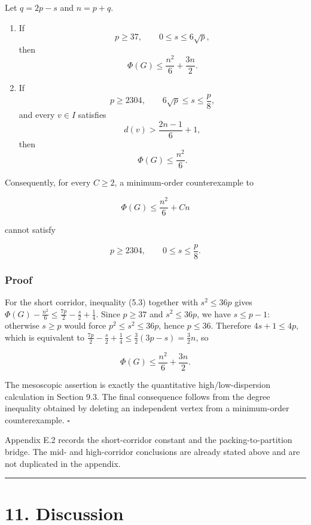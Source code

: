 \documentclass[
  american,
  11pt,
  a4paper,
]{article}
\begin{document}
Let \(q=2p-s\) and \(n=p+q\).

\begin{enumerate}
\def\labelenumi{\arabic{enumi}.}
\item
  If \[
  p\ge37,
  \qquad
  0\le s\le6\sqrt p,
  \] then \[
  \boxed{
  \Phi(G)\le\frac{n^2}{6}+\frac{3n}{2}.
  }
  \tag{10.2}
  \]
\item
  If \[
  p\ge2304,
  \qquad
  6\sqrt p\le s\le\frac p8,
  \] and every \(v\in I\) satisfies \[
  d(v)>\frac{2n-1}{6}+1,
  \] then \[
  \boxed{
  \Phi(G)\le\frac{n^2}{6}.
  }
  \tag{10.3}
  \]
\end{enumerate}

Consequently, for every \(C\ge2\), a minimum-order counterexample to

\[
\Phi(G)\le\frac{n^2}{6}+Cn
\]

cannot satisfy

\[
p\ge2304,
\qquad
0\le s\le\frac p8.
\]

\subsubsection{Proof}\label{proof-8}

For the short corridor, inequality (5.3) together with \(s^2\le36p\) gives \(\Phi(G)-\tfrac{n^2}{6}\le\tfrac{7p}{2}-\tfrac{s}{2}+\tfrac14\). Since \(p\ge37\) and \(s^2\le36p\), we have \(s\le p-1\): otherwise \(s\ge p\) would force \(p^2\le s^2\le36p\), hence \(p\le36\). Therefore \(4s+1\le4p\), which is equivalent to \(\tfrac{7p}{2}-\tfrac{s}{2}+\tfrac14\le\tfrac32(3p-s)=\tfrac32 n\), so

\[
\Phi(G)\le\frac{n^2}{6}+\frac{3n}{2}.
\]

The mesoscopic assertion is exactly the quantitative high/low-dispersion calculation in Section 9.3. The final consequence follows from the degree inequality obtained by deleting an independent vertex from a minimum-order counterexample. \(\square\)

Appendix E.2 records the short-corridor constant and the packing-to-partition bridge. The mid- and high-corridor conclusions are already stated above and are not duplicated in the appendix.

\begin{center}\rule{0.5\linewidth}{0.5pt}\end{center}

\section{11. Discussion}\label{discussion}
\end{document}
